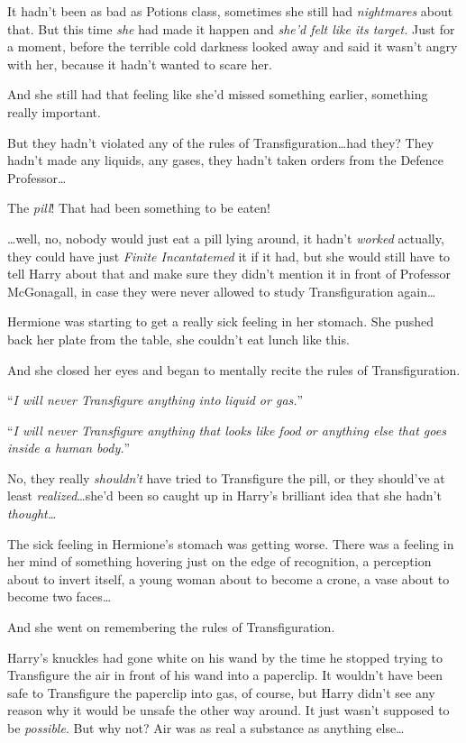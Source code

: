 It hadn’t been as bad as Potions class, sometimes she still had \emph{nightmares} about that. But this time \emph{she} had made it happen and \emph{she’d felt like its target.} Just for a moment, before the terrible cold darkness looked away and said it wasn’t angry with her, because it hadn’t wanted to scare her.

And she still had that feeling like she’d missed something earlier, something really important.

But they hadn’t violated any of the rules of Transfiguration…had they? They hadn’t made any liquids, any gases, they hadn’t taken orders from the Defence Professor…

The \emph{pill}! That had been something to be eaten!

…well, no, nobody would just eat a pill lying around, it hadn’t \emph{worked} actually, they could have just \emph{Finite Incantatemed} it if it had, but she would still have to tell Harry about that and make sure they didn’t mention it in front of Professor McGonagall, in case they were never allowed to study Transfiguration again…

Hermione was starting to get a really sick feeling in her stomach. She pushed back her plate from the table, she couldn’t eat lunch like this.

And she closed her eyes and began to mentally recite the rules of Transfiguration.

“\emph{I will never Transfigure anything into liquid or gas.}”

“\emph{I will never Transfigure anything that looks like food or anything else that goes inside a human body.}”

No, they really \emph{shouldn’t} have tried to Transfigure the pill, or they should’ve at least \emph{realized}…she’d been so caught up in Harry’s brilliant idea that she hadn’t \emph{thought…}

The sick feeling in Hermione’s stomach was getting worse. There was a feeling in her mind of something hovering just on the edge of recognition, a perception about to invert itself, a young woman about to become a crone, a vase about to become two faces…

And she went on remembering the rules of Transfiguration.

\later

Harry’s knuckles had gone white on his wand by the time he stopped trying to Transfigure the air in front of his wand into a paperclip. It wouldn’t have been safe to Transfigure the paperclip into gas, of course, but Harry didn’t see any reason why it would be unsafe the other way around. It just wasn’t supposed to be \emph{possible}. But why not? Air was as real a substance as anything else…

